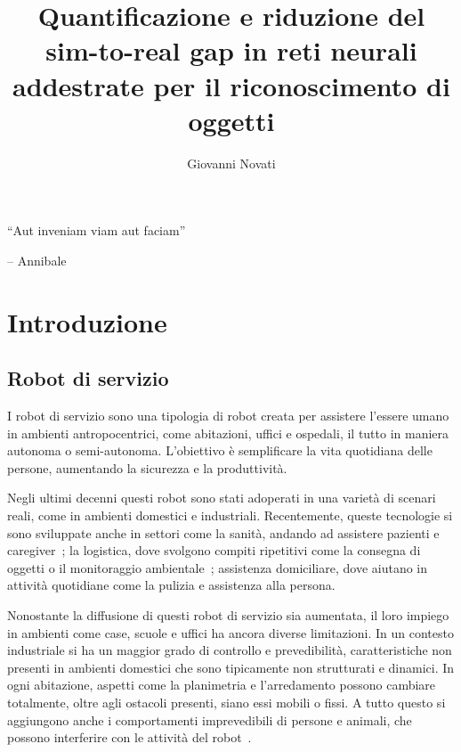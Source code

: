 \documentclass[12pt]{report}
\title{Quantificazione e riduzione del sim-to-real gap in reti neurali addestrate per il riconoscimento di oggetti}
\author{Giovanni Novati}
\begin{document}
\makefrontpage

{\raggedleft \large \sl
	
	\vspace{2cm}
	
	``Aut inveniam viam aut faciam''
	
	\bigskip
	
	\--- Annibale\\}

\beforepreface

\afterpreface

\chapter{Introduzione}
\label{cap:introduzione}

\section{Robot di servizio}
\label{sec:robot_servizio}

I robot di servizio sono una tipologia di robot creata per assistere l'essere umano in ambienti antropocentrici, come abitazioni, uffici e ospedali, il tutto in maniera autonoma o semi-autonoma. L'obiettivo è semplificare la vita quotidiana delle persone, aumentando la sicurezza e la produttività.

Negli ultimi decenni questi robot sono stati adoperati in una varietà di scenari reali, come in ambienti domestici e industriali. Recentemente, queste tecnologie si sono sviluppate anche in settori come la sanità, andando ad assistere pazienti e caregiver~\cite{robotics10010047}; la logistica, dove svolgono compiti ripetitivi come la consegna di oggetti o il monitoraggio ambientale~\cite{fragapane2021405}; assistenza domiciliare, dove aiutano in attività quotidiane come la pulizia e assistenza alla persona.

Nonostante la diffusione di questi robot di servizio sia aumentata, il loro impiego in ambienti come case, scuole e uffici ha ancora diverse limitazioni. In un contesto industriale si ha un maggior grado di controllo e prevedibilità, caratteristiche non presenti in ambienti domestici che sono tipicamente non strutturati e dinamici. In ogni abitazione, aspetti come la planimetria e l'arredamento possono cambiare totalmente, oltre agli ostacoli presenti, siano essi mobili o fissi. A tutto questo si aggiungono anche i comportamenti imprevedibili di persone e animali, che possono interferire con le attività del robot~\cite{6301139}.
\end{document}
